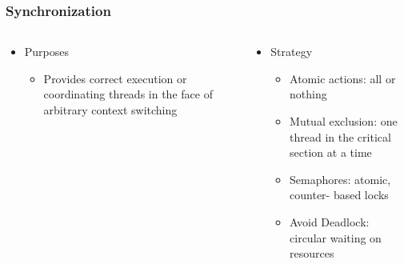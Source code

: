 \begin{frame}[t]
	\frametitle{Synchronization }
	\begin{columns}[t]
		\begin{column}{.5\textwidth}
			
			\begin{itemize}\Large
				\item Purposes
				\begin{itemize}\large
					\item Provides correct
					execution or
					coordinating threads
					in the face of
					arbitrary context
					switching
					
				\end{itemize}
			\end{itemize}
			
		\end{column}
		
		\begin{column}{.5\textwidth}
			
			\begin{itemize}\Large
				\item Strategy
				\begin{itemize}\large
					\item Atomic actions: all or nothing
					\item Mutual exclusion: one thread in the
					critical section at a time
					\item Semaphores: atomic, counter-
					based locks
					\item Avoid Deadlock: circular waiting on
					resources
					
				\end{itemize}
			\end{itemize}
			
		\end{column}
	\end{columns}
\end{frame}

